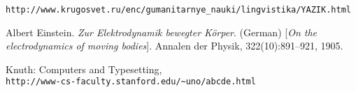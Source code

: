 \documentclass[a4paper,14pt]{extreport} %
\begin{document}

\tableofcontents
\pagebreak








\begin{thebibliography}{9}
\texttt{http://www.krugosvet.ru/enc/gumanitarnye\_nauki/lingvistika/YAZIK.html}
 
Albert Einstein. 
\textit{Zur Elektrodynamik bewegter K{\"o}rper}. (German) 
[\textit{On the electrodynamics of moving bodies}]. 
Annalen der Physik, 322(10):891–921, 1905.
 
Knuth: Computers and Typesetting,
\\\texttt{http://www-cs-faculty.stanford.edu/\~{}uno/abcde.html}
\end{thebibliography}
\end{document}
